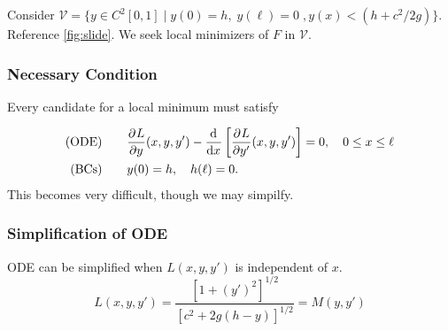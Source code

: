 \documentclass[12pt,twoside]{article}
\begin{document}
Consider $\mathcal{V}=\{y\in C^2[0,1]\;|\;y(0)=h,\; y(\ell)=0\;,
y(x)<(h+c^2/2g)\}.$ Reference \cref{fig:slide}. We seek local minimizers of $F$
in $\mathcal{V}$.

\subsubsection{Necessary Condition}
Every candidate for a local minimum must satisfy

\begin{align*}
  \text{(ODE)}
  &\qquad \frac{\partial^{} {L}}{\partial {y}^{}}(x,y,y')-\frac{\mathrm{d}^{} {}}{\mathrm{d}{x}^{}}\left[ \frac{\partial^{} {L}}{\partial {y'}^{}}(x,y,y') \right]=0,\quad 0\le x\le \ell\\
  \text{(BCs)}
  &\qquad y(0)=h,\quad h(\ell)=0.
\end{align*}
This becomes very difficult, though we may simpilfy.

\subsubsection{Simplification of ODE}
ODE can be simplified when $L(x,y,y')$ is independent of $x$.
\begin{equation*}
  L(x,y,y')=\frac{{[1+{(y')}^2]}^{1/2}}{{[c^2+2g(h-y)]}^{1/2}} = M(y,y')
\end{equation*}
\end{document}
